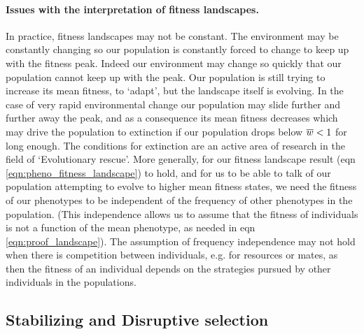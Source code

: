 \paragraph{Issues with the interpretation of fitness landscapes.}
In practice, fitness landscapes may not be constant. The environment
may be constantly changing so our population is constantly forced to change to keep
up with the fitness peak. Indeed our environment may change so quickly
that our population cannot keep up with the peak. Our
population is still trying to increase its mean fitness, to `adapt', but
the landscape itself is evolving.%
  In
the case of very rapid environmental change our population may slide
further and further away the peak, and as a consequence its mean fitness
decreases which may drive the population to extinction if our
population drops below $\overline{w}<1$ for long enough. The conditions for
extinction are an active area of research in the field of
`Evolutionary rescue'. %
More generally, for our fitness landscape result (eqn \eqref{eqn:pheno_fitness_landscape}) to hold, and
for us to be able to talk of our population attempting to evolve to
higher mean fitness states,  we need the fitness of our phenotypes to be independent of the
frequency of other phenotypes in the population. (This independence allows us to
assume that the fitness of individuals is not a function of the mean
phenotype, as needed in eqn \eqref{eqn:proof_landscape}).  The
assumption of frequency independence may not hold when there is competition between individuals, e.g. for resources or
mates, as then the fitness of an individual depends on the strategies pursued
by other individuals in the populations.


 \subsection{Stabilizing and Disruptive selection}

